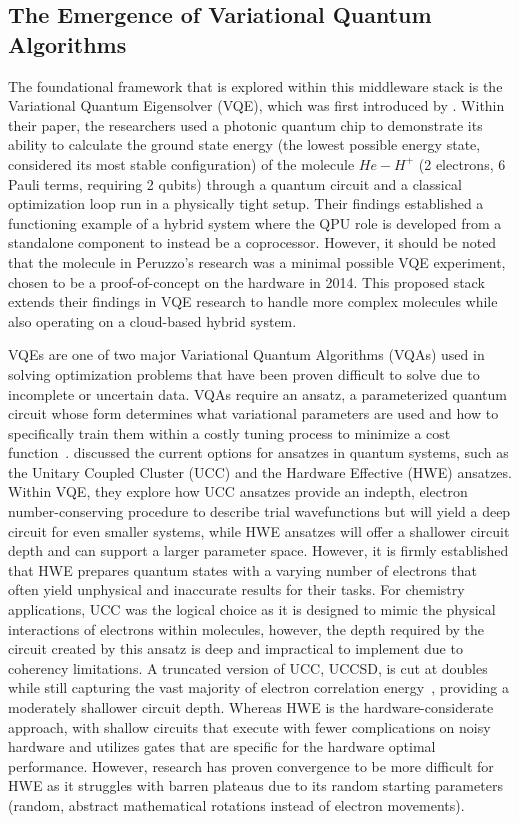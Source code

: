\subsection{The Emergence of Variational Quantum Algorithms}
The foundational framework that is explored within this middleware stack is the Variational Quantum Eigensolver (VQE), which was first introduced 
by \textcite{peruzzo2014variational}. Within their paper, the researchers used a photonic quantum 
chip to demonstrate its ability to calculate the ground state energy (the lowest possible energy state, considered its most stable configuration) of the molecule $He-H^{+}$  
(2 electrons, 6 Pauli terms, requiring 2 qubits) through a quantum circuit and a classical 
optimization loop run in a physically tight setup. Their findings established a functioning example of a hybrid system where
the QPU role is developed from a standalone component to instead be a coprocessor. However, it should be noted that 
the molecule in Peruzzo's research was a minimal possible VQE experiment, chosen to be a proof-of-concept
on the hardware in 2014. This proposed stack extends their findings in  
VQE research to handle more complex molecules while also operating on a cloud-based hybrid system. 

VQEs are one of two major Variational Quantum Algorithms (VQAs) 
used in solving optimization problems that have been proven difficult to solve due to incomplete or
uncertain data. VQAs require an ansatz, a parameterized quantum circuit whose form determines what variational parameters are used and how to specifically train
them within a costly tuning process to minimize a cost function~\parencite{auyeung2023nphard}. \textcite{mccaskey2019quantumchemistrybenchmarknearterm}
discussed the current options for ansatzes in quantum systems, such as the Unitary Coupled Cluster (UCC) and the Hardware Effective (HWE) ansatzes.  
Within VQE, they explore how UCC ansatzes provide an indepth, electron number-conserving procedure to describe trial wavefunctions but will yield a deep circuit
for even smaller systems, while HWE ansatzes will offer a shallower circuit depth and can support a larger parameter space. However, it is firmly established that
HWE prepares quantum states with a varying number of electrons that often yield unphysical and inaccurate results for their tasks. For chemistry applications, 
UCC was the logical choice as it is designed to mimic the physical interactions of electrons within molecules, 
however, the depth required by the circuit created by this ansatz is deep and impractical to implement due to coherency 
limitations. A truncated version of UCC, UCCSD, is cut at doubles while still capturing the vast majority of electron 
correlation energy~\parencite{romero2018strategiesquantumcomputingmolecular}, providing a moderately shallower circuit depth.  
Whereas HWE is the hardware-considerate approach, with shallow circuits that execute with fewer complications on noisy 
hardware and utilizes gates that are specific for the hardware optimal performance. However, research has proven convergence 
to be more difficult for HWE as it struggles with barren plateaus due to its random starting parameters (random, abstract mathematical 
rotations instead of electron movements)\parencite{kandala2017hardware}.  


